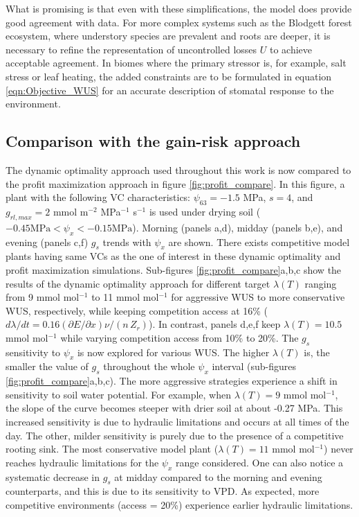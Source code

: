 \documentclass[utf8]{frontiersSCNS} %
\begin{document}
What is promising is that even with these simplifications, the model does provide good agreement with data. For more complex systems such as the Blodgett forest ecosystem, where understory species are prevalent and roots are deeper, it is necessary to refine the representation of uncontrolled losses $U$ to achieve acceptable agreement. In biomes where the primary stressor is, for example, salt stress or leaf heating, the added constraints are to be formulated in equation \ref{eqn:Objective_WUS} for an accurate description of stomatal response to the environment. 

\subsection{Comparison with the gain-risk approach}

The dynamic optimality approach used throughout this work is now compared to the profit maximization approach in figure \ref{fig:profit_compare}. In this figure, a plant with the following VC characteristics: $\psi_{63} = -1.5$ MPa, $s=4$, and $g_{rl,max} = 2$ mmol m$^{-2}$ MPa$^{-1}$ s$^{-1}$ is used under drying soil ($-0.45 \text{MPa} < \psi_x < -0.15 \text{MPa}$). Morning (panels a,d), midday (panels b,e), and evening (panels c,f) $g_s$ trends with $\psi_x$ are shown. There exists competitive model plants having same VCs as the one of interest in these dynamic optimality and profit maximization simulations. Sub-figures \ref{fig:profit_compare}a,b,c show the results of the dynamic optimality approach for different target $\lambda(T)$ ranging from 9 mmol mol$^{-1}$ to 11 mmol mol$^{-1}$ for aggressive WUS to more conservative WUS, respectively, while keeping competition access at 16\% ($d\lambda/dt = 0.16 (\partial E / \partial x) \nu/(n\, Z_r) $). In contrast, panels d,e,f keep $\lambda(T)=10.5$ mmol mol$^{-1}$ while varying competition access from 10\% to 20\%.
The $g_s$ sensitivity to $\psi_x$ is now explored for various WUS. The higher $\lambda(T)$ is, the smaller the value of $g_s$ throughout the whole $\psi_x$ interval (sub-figures \ref{fig:profit_compare}a,b,c). The more aggressive strategies experience a shift in sensitivity to soil water potential. For example, when $\lambda(T)=9$ mmol mol$^{-1}$, the slope of the curve becomes steeper with drier soil at about -0.27 MPa. This increased sensitivity is due to hydraulic limitations and occurs at all times of the day. The other, milder sensitivity is purely due to the presence of a competitive rooting sink. The most conservative model plant ($\lambda(T) = 11$ mmol mol$^{-1}$) never reaches hydraulic limitations for the $\psi_x$ range considered. One can also notice a systematic decrease in $g_s$ at midday compared to the morning and evening counterparts, and this is due to its sensitivity to VPD.  As expected, more competitive environments (access = 20\%) experience earlier hydraulic limitations.
\end{document}
